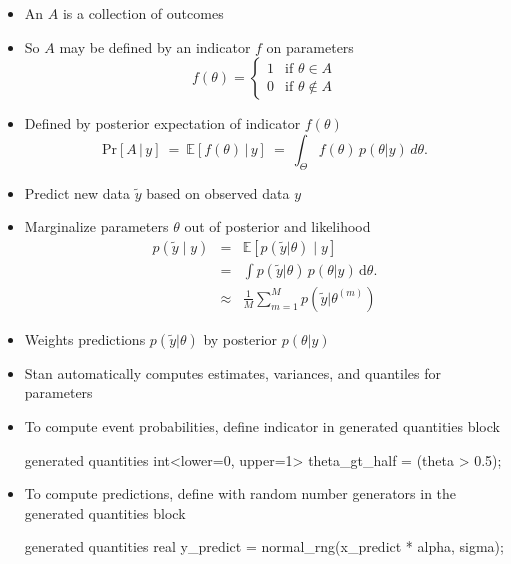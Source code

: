 \documentclass[10pt]{report}
\begin{document}
%
\begin{itemize}
\item An  $A$ is a collection of outcomes
\item So $A$ may be defined by an indicator $f$ on parameters
\[
f(\theta)
=
\begin{cases}
1 & \text{if } \theta \in A
\\
0 & \text{if } \theta \not\in A
\end{cases}
\]
\item Defined by posterior expectation of indicator $f(\theta)$
\[
\mathrm{Pr}[A \,|\, y]
\ = \
\mathbb{E}\left[ f(\theta) \, | \, y \right]
\ = \
\int_{\Theta} f(\theta) \, p(\theta|y) \, d\theta.
\]
\end{itemize}


%
\begin{itemize}
\item Predict new data $\tilde{y}$ based on observed data $y$
\item Marginalize parameters $\theta$ out of posterior and likelihood
\begin{eqnarray*}
p(\tilde{y} \mid y)
& = & \mathbb{E}[p(\tilde{y} | \theta) \mid y]
\\[6pt]
& = &
\int p(\tilde{y} | \theta) \, p(\theta | y) \, \mathrm{d}\theta.
\\[6pt]
& \approx &
\frac{1}{M} \sum_{m=1}^M p(\tilde{y} | \theta^{(m)})
\end{eqnarray*}
\item Weights predictions $p(\tilde{y}|\theta)$ by posterior $p(\theta|y)$
\end{itemize}





%
\begin{itemize}
\item Stan automatically computes estimates, variances, and quantiles
  for parameters
\item To compute event probabilities, define indicator in generated
  quantities block
\begin{stancode}
generated quantities {
  int<lower=0, upper=1> theta_gt_half = (theta > 0.5);
}
\end{stancode}
\item To compute predictions, define with random number generators in
  the generated quantities block
\begin{stancode}
generated quantities {
  real y_predict = normal_rng(x_predict * alpha, sigma);
}
\end{stancode}
\end{itemize}
\end{document}
